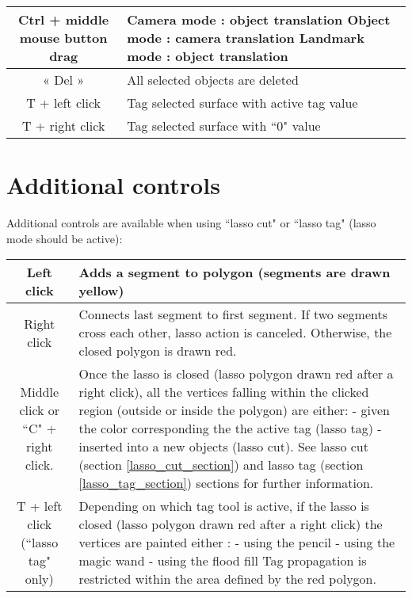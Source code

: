 \begin{tabularx}{\linewidth}{ | c | X | }
Ctrl + middle mouse button drag 
& Camera mode : object translation\newline
Object mode : camera translation\newline
Landmark mode : object translation \\ \hline			

« Del » & All selected objects are deleted \\ \hline			

T + left click & Tag selected surface with active tag value \\ \hline			
 
T + right click & Tag selected surface with ``0" value \\ \hline			

 \end{tabularx}

\section{Additional controls}
Additional controls are available when using ``lasso cut" or ``lasso tag" (lasso mode should be active):\\
\begin{tabularx}{\linewidth}{ | c | X | }
\hline			
Left click & Adds a segment to polygon (segments are drawn yellow) \\ \hline			

Right click & Connects last segment to first segment. If two segments cross each other, lasso action is canceled. Otherwise, the closed polygon is drawn red.\\ \hline			

Middle click or ``C" + right click. & Once the lasso is closed (lasso polygon drawn red
after a right click), all the vertices falling within the clicked region (outside or inside the polygon) are either:\newline
- given the color corresponding the the active tag (lasso tag)\newline
- inserted into a new objects (lasso cut).\newline 
See lasso cut (section \ref{lasso_cut_section}) and lasso tag (section \ref{lasso_tag_section}) sections for further information.\\ \hline	
		
T + left click (``lasso tag" only) & Depending on which tag tool is active, if the
lasso is closed (lasso polygon drawn red after a right click) the vertices are painted either :\newline 
- using the pencil\newline 
- using the magic wand\newline 
- using the flood fill\newline 
Tag propagation is restricted within the area defined by the red polygon.\\ \hline		
	
\end{tabularx}

